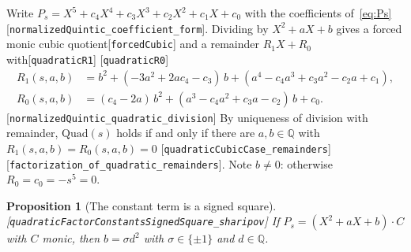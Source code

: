 \documentclass[10pt]{article}
\newtheorem{proposition}[theorem]{Proposition}
\theoremstyle{definition}
\theoremstyle{remark}
\newcommand{\Q}{\mathbb{Q}}
\newcommand{\leanref}[1]{{\scriptsize\textup{[\texttt{#1}]}}\allowbreak}
\begin{document}
Write $P_s=X^5+c_4X^4+c_3X^3+c_2X^2+c_1X+c_0$ with the coefficients
of~\eqref{eq:Ps} \leanref{normalized\allowbreak Quintic\_\allowbreak coefficient\_\allowbreak form}.  Dividing by
$X^2+aX+b$ gives a forced monic cubic quotient\leanref{forced\allowbreak Cubic} and a
remainder $R_1X+R_0$ with\leanref{quadratic\allowbreak R1} \leanref{quadratic\allowbreak R0}
\begin{align*}
R_1(s,a,b)&=b^2+(-3a^2+2ac_4-c_3)\,b+(a^4-c_4a^3+c_3a^2-c_2a+c_1),\\
R_0(s,a,b)&=(c_4-2a)\,b^2+(a^3-c_4a^2+c_3a-c_2)\,b+c_0 .
\end{align*}
\leanref{normalized\allowbreak Quintic\_\allowbreak quadratic\_\allowbreak division}
By uniqueness of division with remainder, $\mathrm{Quad}(s)$ holds if and only if
there are $a,b\in\Q$ with $R_1(s,a,b)=R_0(s,a,b)=0$
\leanref{quadratic\allowbreak Cubic\allowbreak Case\_\allowbreak remainders} \leanref{factorization\_\allowbreak of\_\allowbreak quadratic\_\allowbreak remainders}.
Note $b\ne0$: otherwise $R_0=c_0=-s^5=0$.

\begin{proposition}[The constant term is a signed square]\label{prop:C012}
\leanref{quadratic\allowbreak Factor\allowbreak Constants\allowbreak Signed\allowbreak Square\_\allowbreak sharipov}
If $P_s=(X^2+aX+b)\cdot C$ with $C$ monic, then $b=\sigma d^2$ with
$\sigma\in\{\pm1\}$ and $d\in\Q$.
\end{proposition}
\end{document}
